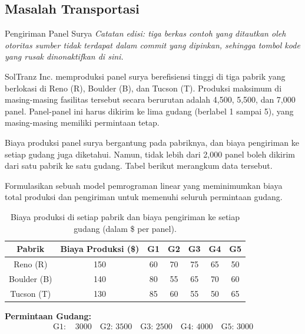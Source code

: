 \subsection{Masalah Transportasi}
\begin{example}{Pengiriman Panel Surya}{}
\emph{Catatan edisi: tiga berkas contoh yang ditautkan oleh otoritas sumber tidak terdapat dalam commit yang dipinkan, sehingga tombol kode yang rusak dinonaktifkan di sini.}

SolTranz Inc. memproduksi panel surya berefisiensi tinggi di tiga pabrik yang berlokasi di Reno (R), Boulder (B), dan Tucson (T). Produksi maksimum di masing-masing fasilitas tersebut secara berurutan adalah 4,500, 5,500, dan 7,000 panel. Panel-panel ini harus dikirim ke lima gudang (berlabel 1 sampai 5), yang masing-masing memiliki permintaan tetap.

Biaya produksi panel surya bergantung pada pabriknya, dan biaya pengiriman ke setiap gudang juga diketahui. Namun, tidak lebih dari 2,000 panel boleh dikirim dari satu pabrik ke satu gudang. Tabel berikut merangkum data tersebut.

Formulasikan sebuah model pemrograman linear yang meminimumkan biaya total produksi dan pengiriman untuk memenuhi seluruh permintaan gudang.

\end{example}

\begin{table}[h!] \begin{center} \begin{tabular} {|c|c|c|c|c|c|c|}
\hline Pabrik  & Biaya Produksi (\$) & G1 & G2 & G3 & G4 & G5 \\ \hline
\hline Reno (R)     & 150     & 60  & 70  & 75  & 65  & 50 \\
\hline Boulder (B)  & 140     & 80  & 55  & 65  & 70  & 60 \\
\hline Tucson (T)   & 130     & 85  & 60  & 55  & 50  & 65 \\
\hline
\end{tabular} \end{center} \caption{Biaya produksi di setiap pabrik dan biaya pengiriman ke setiap gudang (dalam \$ per panel).}\label{tab:modeling-linear-programming-tab10}%
\end{table}

\textbf{Permintaan Gudang:}
\[
\begin{aligned}
\text{G1: } & 3000 \quad \text{G2: } 3500 \quad \text{G3: } 2500 \quad \text{G4: } 4000 \quad \text{G5: } 3000
\end{aligned}
\]

